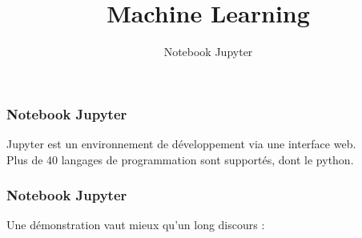 \documentclass{formation}
\title{Machine Learning}
\subtitle{Notebook Jupyter}
\begin{document}
\maketitle

\begin{frame}
  \frametitle{Notebook Jupyter}
  Jupyter est un environnement de développement via une interface web. \\
  Plus de 40 langages de programmation sont supportés, dont le python. \\
\end{frame}

\begin{frame}
  \frametitle{Notebook Jupyter}
  Une démonstration vaut mieux qu'un long discours : \\
\end{frame}
\end{document}
